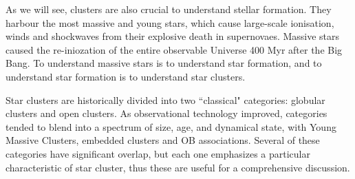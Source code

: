 


As we will see, clusters are also crucial to understand stellar formation. They harbour the most massive and young stars, which cause large-scale ionisation, winds and shockwaves from their explosive death in supernovaes. Massive stars caused the re-iniozation of the entire observable Universe 400 Myr after the Big Bang. To understand massive stars is to understand star formation, and to understand star formation is to understand star clusters.



%
%


Star clusters are historically divided into two ``classical" categories: globular clusters and open clusters. As observational technology improved, categories tended to blend into a spectrum of size, age, and dynamical state, with Young Massive Clusters, embedded clusters and OB associations. Several of these categories have significant overlap, but each one emphasizes a particular characteristic of star cluster, thus these are useful for a comprehensive discussion.


